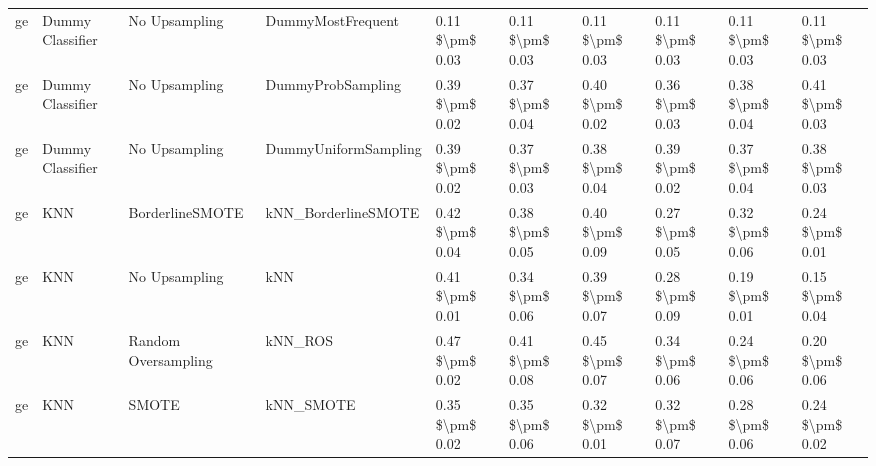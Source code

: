 \begin{tabular}{llllllllll}
      ge &                Dummy Classifier &                 No Upsampling &                            DummyMostFrequent & 0.11 \$\textbackslash pm\$ 0.03 &           0.11 \$\textbackslash pm\$ 0.03 &       0.11 \$\textbackslash pm\$ 0.03 &        0.11 \$\textbackslash pm\$ 0.03 &                         0.11 \$\textbackslash pm\$ 0.03 &     0.11 \$\textbackslash pm\$ 0.03 \\
      ge &                Dummy Classifier &                 No Upsampling &                            DummyProbSampling & 0.39 \$\textbackslash pm\$ 0.02 &           0.37 \$\textbackslash pm\$ 0.04 &       0.40 \$\textbackslash pm\$ 0.02 &        0.36 \$\textbackslash pm\$ 0.03 &                         0.38 \$\textbackslash pm\$ 0.04 &     0.41 \$\textbackslash pm\$ 0.03 \\
      ge &                Dummy Classifier &                 No Upsampling &                         DummyUniformSampling & 0.39 \$\textbackslash pm\$ 0.02 &           0.37 \$\textbackslash pm\$ 0.03 &       0.38 \$\textbackslash pm\$ 0.04 &        0.39 \$\textbackslash pm\$ 0.02 &                         0.37 \$\textbackslash pm\$ 0.04 &     0.38 \$\textbackslash pm\$ 0.03 \\
      ge &                             KNN &               BorderlineSMOTE &                          kNN\_BorderlineSMOTE & 0.42 \$\textbackslash pm\$ 0.04 &           0.38 \$\textbackslash pm\$ 0.05 &       0.40 \$\textbackslash pm\$ 0.09 &        0.27 \$\textbackslash pm\$ 0.05 &                         0.32 \$\textbackslash pm\$ 0.06 &     0.24 \$\textbackslash pm\$ 0.01 \\
      ge &                             KNN &                 No Upsampling &                                          kNN & 0.41 \$\textbackslash pm\$ 0.01 &           0.34 \$\textbackslash pm\$ 0.06 &       0.39 \$\textbackslash pm\$ 0.07 &        0.28 \$\textbackslash pm\$ 0.09 &                         0.19 \$\textbackslash pm\$ 0.01 &     0.15 \$\textbackslash pm\$ 0.04 \\
      ge &                             KNN &           Random Oversampling &                                      kNN\_ROS & 0.47 \$\textbackslash pm\$ 0.02 &           0.41 \$\textbackslash pm\$ 0.08 &       0.45 \$\textbackslash pm\$ 0.07 &        0.34 \$\textbackslash pm\$ 0.06 &                         0.24 \$\textbackslash pm\$ 0.06 &     0.20 \$\textbackslash pm\$ 0.06 \\
      ge &                             KNN &                         SMOTE &                                    kNN\_SMOTE & 0.35 \$\textbackslash pm\$ 0.02 &           0.35 \$\textbackslash pm\$ 0.06 &       0.32 \$\textbackslash pm\$ 0.01 &        0.32 \$\textbackslash pm\$ 0.07 &                         0.28 \$\textbackslash pm\$ 0.06 &     0.24 \$\textbackslash pm\$ 0.02 \\

\end{tabular}
